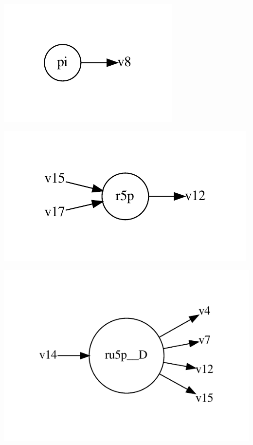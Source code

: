 \documentclass{scrartcl}
\begin{document}
\begin{minipage}{0.33\linewidth}
\includegraphics[max width=\linewidth]{metabolic_maps/pi.pdf}
\end{minipage}
\begin{minipage}{0.33\linewidth}
\includegraphics[max width=\linewidth]{metabolic_maps/r5p.pdf}
\end{minipage}
\begin{minipage}{0.33\linewidth}
\includegraphics[max width=\linewidth]{metabolic_maps/ru5p__D.pdf}
\end{minipage}
\end{document}
